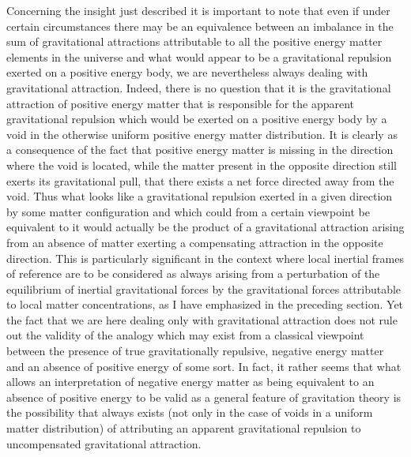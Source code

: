 \documentclass[notitlepage,12pt]{report}
\begin{document}
\noindent Concerning the insight just described it is important to note that even if under certain circumstances there may be an equivalence between an imbalance in the sum of gravitational attractions attributable to all the positive energy matter elements in the universe and what would appear to be a gravitational repulsion exerted on a positive energy body, we are nevertheless always dealing with gravitational attraction. Indeed, there is no question that it is the gravitational attraction of positive energy matter that is responsible for the apparent gravitational repulsion which would be exerted on a positive energy body by a void in the otherwise uniform positive energy matter distribution. It is clearly as a consequence of the fact that positive energy matter is missing in the direction where the void is located, while the matter present in the opposite direction still exerts its gravitational pull, that there exists a net force directed away from the void. Thus what looks like a gravitational repulsion exerted in a given direction by some matter configuration and which could from a certain viewpoint be equivalent to it would actually be the product of a gravitational attraction arising from an absence of matter exerting a compensating attraction in the opposite direction. This is particularly significant in the context where local inertial frames of reference are to be considered as always arising from a perturbation of the equilibrium of inertial gravitational forces by the gravitational forces attributable to local matter concentrations, as I have emphasized in the preceding section. Yet the fact that we are here dealing only with gravitational attraction does not rule out the validity of the analogy which may exist from a classical viewpoint between the presence of true gravitationally repulsive, negative energy matter and an absence of positive energy of some sort. In fact, it rather seems that what allows an interpretation of negative energy matter as being equivalent to an absence of positive energy to be valid as a general feature of gravitation theory is the possibility that always exists (not only in the case of voids in a uniform matter distribution) of attributing an apparent gravitational repulsion to uncompensated gravitational attraction.
\end{document}
